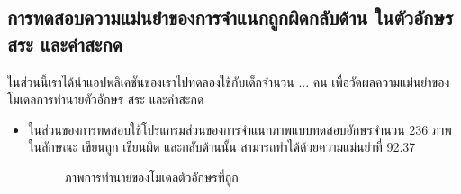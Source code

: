 \documentclass[12pt,oneside,openright,a4paper]{cpe-thai-project}
\begin{document}
\subsection{การทดสอบความแม่นยำของการจำแนกถูกผิดกลับด้าน ในตัวอักษร สระ และคำสะกด}
ในส่วนนี้เราได้นำแอปพลิเคชันของเราไปทดลองใช้กับเด็กจำนวน ... คน เพื่อวัดผลความแม่นยำของโมเดลการทำนายตัวอักษร สระ และคำสะกด 
\begin{itemize}
  \item ในส่วนของการทดสอบใช้โปรแกรมส่วนของการจำแนกภาพแบบทดสอบอักษรจำนวน 236 ภาพในลักษณะ เขียนถูก เขียนผิด และกลับด้านนั้น สามารถทำได้ด้วยความแม่นยำที่ 92.37%
  \begin{figure}[!h]\centering
    \setlength{\fboxrule}{0.2mm} %
    \setlength{\fboxsep}{1cm}
    \caption{ภาพการทำนายของโมเดลตัวอักษรที่ถูก}\label{fig:system}                  
   \end{figure}
   \newpage
   \begin{figure}[!h]\centering
    \setlength{\fboxrule}{0.2mm} %
    \setlength{\fboxsep}{1cm}

\end{figure}
\end{itemize}
\end{document}
